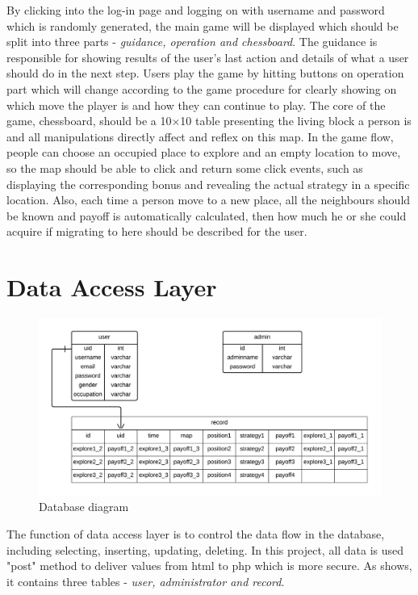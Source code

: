 By clicking into the log-in page and logging on with username and password which is randomly generated, the main game will be displayed which should be split into three parts - \textit{guidance, operation and chessboard}. The guidance is responsible for showing results of the user's last action and details of what a user should do in the next step. Users play the game by hitting buttons on operation part  which will change according to the game procedure for clearly showing on which move the player is and how they can continue to play. The core of the game, chessboard, should be a 10$\times$10 table presenting the living block a person is and all manipulations directly affect and reflex on this map. In the game flow, people can choose an occupied place to explore and an empty location to move, so the map should be able to click and return some click events, such as displaying the corresponding bonus and revealing the actual strategy in a specific location. Also, each time a person move to a new place, all the neighbours should be known and payoff is automatically calculated, then how much he or she could acquire if migrating to here should be described for the user.

\section{Data Access Layer}
\begin{figure}[!htb]
	\centering
	\includegraphics[width=14cm]{database.png}
	\caption{Database diagram}
	\label{Figure:figdb}
\end{figure}
The function of data access layer is to control the data flow in the database, including selecting, inserting, updating, deleting. In this project, all data is used "post" method to deliver values from html to php which is more secure. As  shows, it contains three tables - \textit{user, administrator and record}.

